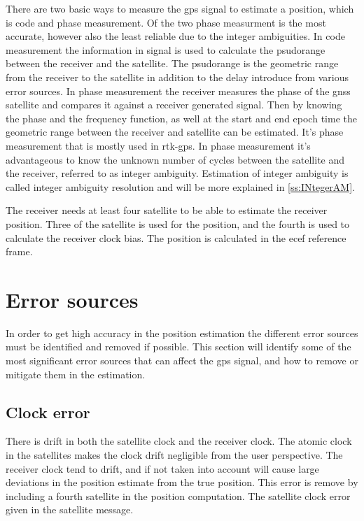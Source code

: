 There are two basic ways to measure the \gls{gps} signal to estimate a position, which is code and phase measurement. Of the two phase measurment is the most accurate, however also the least reliable due to the integer ambiguities. In code measurement the information in signal is used to calculate the psudorange between the receiver and the satellite. The psudorange is the geometric range from the receiver to the satellite in addition to the delay introduce from various error sources. In phase measurement the receiver measures the phase of the \gls{gnss} satellite and compares it against a receiver generated signal. Then by knowing the phase and the frequency function, as well at the start and end epoch time the geometric range between the receiver and satellite can be estimated. It's phase measurement that is mostly used in \gls{rtk-gps}. In phase measurement it's advantageous to know the unknown number of cycles between the satellite and the receiver, referred to as integer ambiguity. Estimation of integer ambiguity is called integer ambiguity resolution and will be more explained in \ref{ss:INtegerAM}.

The receiver needs at least four satellite to be able to estimate the receiver position. Three of the satellite is used for the position, and the fourth is used to calculate the receiver clock bias. The position is calculated in the \gls{ecef} reference frame. 
 
\section{Error sources}
In order to get high accuracy in the position estimation the different error sources must be identified and removed if possible. This section will identify some of the most significant error sources that can affect the \gls{gps} signal, and how to remove or mitigate them in the estimation.
\subsection{Clock error}
There is drift in both the satellite clock and the receiver clock. The atomic clock in the satellites makes the clock drift negligible from the user perspective. The receiver clock tend to drift, and if not taken into account will cause large deviations in the position estimate from the true position. This error is remove by including a fourth satellite in the position computation. The satellite clock error given in the satellite message. 

